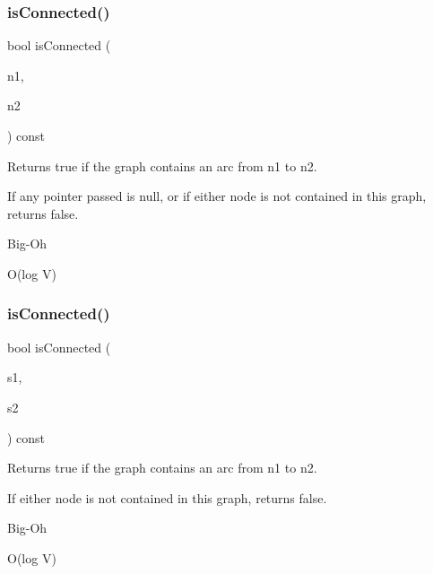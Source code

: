 \subsubsection{\texorpdfstring{is\+Connected()}{isConnected()}\hspace{0.1cm}{\footnotesize\ttfamily [1/2]}}
{\footnotesize\ttfamily bool is\+Connected (\begin{DoxyParamCaption}\item[{Node\+Type $\ast$}]{n1,  }\item[{Node\+Type $\ast$}]{n2 }\end{DoxyParamCaption}) const}



Returns {\ttfamily true} if the graph contains an arc from {\ttfamily n1} to {\ttfamily n2}. 

If any pointer passed is null, or if either node is not contained in this graph, returns false. \begin{DoxyRefDesc}{Big-\/\+Oh}
\item[\mbox{\hyperlink{BigOh__BigOh000078}{Big-\/\+Oh}}]O(log V) \end{DoxyRefDesc}
\mbox{\label{classGraph_a3623b7decbedc522041c2c39d3b14421}} 
\subsubsection{\texorpdfstring{is\+Connected()}{isConnected()}\hspace{0.1cm}{\footnotesize\ttfamily [2/2]}}
{\footnotesize\ttfamily bool is\+Connected (\begin{DoxyParamCaption}\item[{const std\+::string \&}]{s1,  }\item[{const std\+::string \&}]{s2 }\end{DoxyParamCaption}) const}



Returns {\ttfamily true} if the graph contains an arc from {\ttfamily n1} to {\ttfamily n2}. 

If either node is not contained in this graph, returns false. \begin{DoxyRefDesc}{Big-\/\+Oh}
\item[\mbox{\hyperlink{BigOh__BigOh000079}{Big-\/\+Oh}}]O(log V) \end{DoxyRefDesc}
\mbox{\label{classGraph_acf82f9b2937375c7b1cf3dccb3df3312}} 
